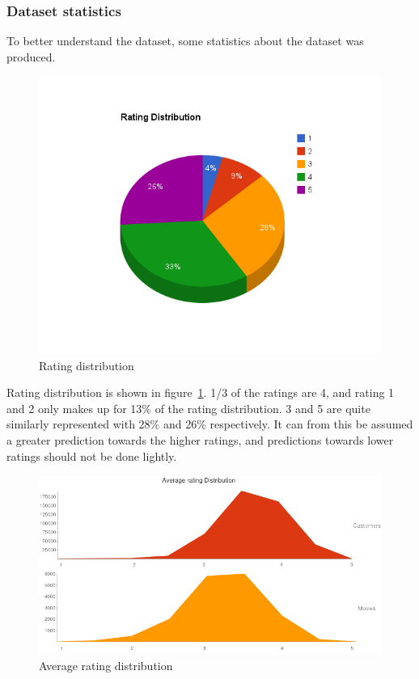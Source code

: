 \subsubsection{Dataset statistics}

To better understand the dataset, some statistics about the dataset was produced.

\begin{figure}[H]
\includegraphics[width=5in]{image/ratingdistr.png}
\centering
\caption{Rating distribution}
\label{figure:ratingdistr}
\end{figure}

Rating distribution is shown in figure~\ref{figure:ratingdistr}. 1/3 of the ratings are 4, and rating 1 and 2 only makes up for 13\% of the rating distribution. 3 and 5 are quite similarly represented with 28\% and 26\% respectively. It can from this be assumed a greater prediction towards the higher ratings, and predictions towards lower ratings should not be done lightly.

\begin{figure}[H]
\includegraphics[width=5in]{image/avgratingdistr.png}
\centering
\caption{Average rating distribution}
\label{figure:avgratingdistr}
\end{figure}

